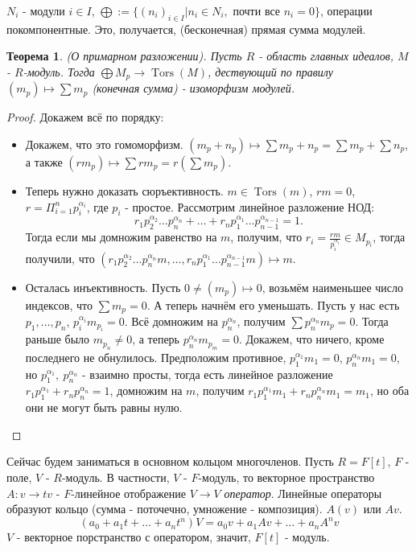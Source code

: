 \documentclass[a4paper,100pt]{article}
\theoremstyle{indented}
\newtheorem{theorem}{Теорема}
\theoremstyle{definition}
\theoremstyle{remark}
\DeclareMathOperator{\Tors}{Tors}
\begin{document}
$N_i$ - модули $i\in I$, $\bigoplus :=\{(n_i)_{i\in I}\vert n_i\in N_i, \text{ почти все }n_i=0\}$, операции покомпонентные. Это, получается, (бесконечная) прямая сумма модулей.\\

\begin{theorem}
    (О примарном разложении). Пусть $R$ - область главных идеалов, $M$ - $R$-модуль. Тогда $\bigoplus M_p \rightarrow \Tors (M)$, дествующий по правилу $(m_p)\mapsto \sum m_p$ (конечная сумма) - изоморфизм модулей.
\end{theorem}

\begin{proof}
    Докажем всё по порядку:\

    \begin{itemize}
        \item Докажем, что это гомоморфизм. $(m_p+n_p)\mapsto \sum m_p+n_p=\sum m_p+\sum n_p$, а также $(rm_p)\mapsto \sum rm_p=r(\sum m_p)$. 
        \item Теперь нужно доказать сюръективность. $m\in \Tors (m)$, $rm=0$, $r=\Pi_{i=1}^np_i^{\alpha_i}$, где $p_i$ - простое. Рассмотрим линейное разложение $\text{НОД}$: 
        \[
            r_1p_2^{\alpha_2}\ldots p_n^{\alpha_n}+\ldots+r_np_1^{\alpha_1}\ldots p_{n-1}^{\alpha_{n-1}}=1.
        \]
        Тогда если мы домножим равенство на $m$, получим, что $r_i=\frac{rm}{p_i^{\alpha_i}}\in M_{p_i}$, тогда получили, что $(r_1p_2^{\alpha_2} \ldots  p_n^{\alpha_n}m, \ldots, r_np_1^{\alpha_1}\ldots p_{n-1}^{\alpha_{n-1}}m)\mapsto m$.
        \item Осталась инъективность. Пусть $0\neq(m_p)\mapsto 0$, возьмём наименьшее число индексов, что $\sum m_p=0$. А теперь начнём его уменьшать. Пусть у нас есть $p_1, \ldots , p_n$, $p_i^{\alpha_i}m_{p_i}=0$. Всё домножим на $p_n^{\alpha_n}$, получим $\sum p_n^{\alpha_n}m_p=0$. Тогда раньше было $m_{p_n}\neq 0$, а теперь $p_n^{\alpha_n}m_{p_m}=0$. Докажем, что ничего, кроме последнего не обнулилось. Предположим противное, $p_1^{\alpha_1}m_1=0$, $p_n^{\alpha_n}m_1=0$, но $p_1^{\alpha_1}, \: p_n^{\alpha_n}$ - взаимно просты, тогда есть линейное разложение $r_1p_1^{\alpha_1}+ r_n p_n^{\alpha_n}=1$, домножим на $m$, получим $r_1p_1^{\alpha_1}m_1+ r_n p_n^{\alpha_n}m_1=m_1$, но оба они не могут быть равны нулю.
    \end{itemize}
\end{proof}

Сейчас будем заниматься в основном кольцом многочленов. Пусть $R=F[t]$, $F$ - поле, $V$ - $R$-модуль. В частности, $V$ - $F$-модуль, то векторное пространство $A:v\rightarrow tv$ - $F$-линейное отображение $V\rightarrow V$ \textit{оператор}. Линейные операторы образуют кольцо (сумма - поточечно, умножение - композиция). $A(v)$ или $Av$.
\[
    (a_0+a_1t+\ldots+a_nt^n)V=a_0v+a_1Av+\ldots+a_nA^nv
\]
$V$ - векторное порстранство с оператором, значит, $F[t]$ - модуль.\ 
\end{document}
